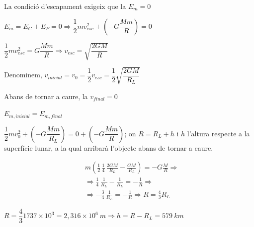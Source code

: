 \begin{solapartat}
 La condició d'escapament exigeix que la $E_m = 0$

 $E_m = E_C + E_P = 0 \Rightarrow \dfrac{1}{2}mv^2_{esc} + \left(-G\dfrac{Mm}{R}\right) = 0$

 $\dfrac{1}{2}mv^2_{esc} = G\dfrac{Mm}{R} \Rightarrow v_{esc} = \sqrt{\dfrac{2GM}{R}}$
\end{solapartat}

\begin{solapartat}
Denominem, $v_{\mathit{inicial}} = v_0 = \dfrac{1}{2}v_{esc} = \dfrac{1}{2}\sqrt{\dfrac{2GM}{R_L}}$

 Abans de tornar a caure, la $v_{\mathit{final}} = 0$

 $E_{m,\mathit{inicial}} = E_{m,\mathit{final}}$

 $\dfrac{1}{2}mv_0^2 + \left(-G\dfrac{Mm}{R_L}\right) = 0 + \left(-G\dfrac{Mm}{R}\right)$; on $R = R_L + h$ i $h$ l'altura respecte a la superfície lunar, a la qual arribarà l'objecte abans de tornar a caure.

\begin{align*}
&m\left(\frac{1}{2}\,\frac{1}{4}\,\frac{2GM}{R_L} - \frac{GM}{R_L}\right) = -G\frac{M}{R} \Rightarrow\\
&\Rightarrow \frac{1}{4}\,\frac{1}{R_L} - \frac{1}{R_L} = -\frac{1}{R} \Rightarrow\\
&\Rightarrow -\frac{3}{4}\,\frac{1}{R_L} = -\frac{1}{R} \Rightarrow R = \frac{4}{3}R_L
\end{align*}

 $R = \dfrac{4}{3}1737\times 10^{3} = 2,316\times 10^{6}\ m \Rightarrow h = R - R_L = 579\ km$
\end{solapartat}
